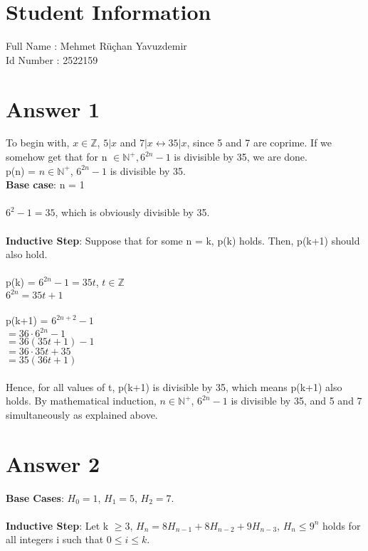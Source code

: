 \documentclass[12pt]{article}
\begin{document}
\section*{Student Information }

Full Name : Mehmet Rüçhan Yavuzdemir \\
Id Number : 2522159 \\

\section*{Answer 1}
To begin with, $x\in \mathbb{Z}$, $5 | x $ and $ 7 | x \leftrightarrow 35 | x$, since 5 and 7 are coprime. If we somehow get that for n $\in \mathbb{N^+}, 6^{2n} - 1$ is divisible by 35, we are done.\\

\noindent p(n) = $n\in \mathbb{N^+}$, $6^{2n} - 1$ is divisible by 35. \\
\textbf{Base case}: n = 1 \\\\
    $6^{2}-1 = 35$, which is obviously divisible by 35.\\\\
\textbf{Inductive Step}: Suppose that for some n = k, p(k) holds. Then, p(k+1) should also hold. \\\\
p(k) = $6^{2n} - 1 = 35t$, $t \in \mathbb{Z}$ \\
$6^{2n} = 35t + 1$\\\\
p(k+1) = $6^{2n+2} - 1$ \\
$= 36\cdot6^{2n} - 1$ \\
$= 36(35t + 1) - 1$ \\
$= 36\cdot35t + 35$ \\
$= 35(36t + 1)$ \\\\
Hence, for all values of t, p(k+1) is divisible by 35, which means p(k+1) also holds. By mathematical induction, $n\in \mathbb{N^+}$, $6^{2n} - 1$ is divisible by 35, and 5 and 7 simultaneously as explained above.

\section*{Answer 2}
\textbf{Base Cases}: $H_0 = 1$, $H_1 = 5$, $H_2 = 7$. \\\\
\textbf{Inductive Step}:
Let k $\geq 3$, $H_n = 8H_{n-1} + 8H_{n-2} + 9H_{n-3}$, $H_n \leq 9^n$ holds for all integers i such that $0 \leq i \leq k$.\\
\end{document}
